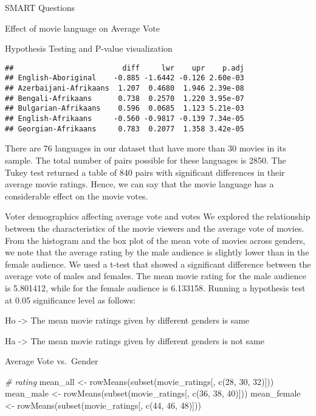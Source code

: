 \documentclass[
  ignorenonframetext,
]{beamer}
\newenvironment{Shaded}{\begin{snugshade}}{\end{snugshade}}
\newcommand{\CommentTok}[1]{\textcolor[rgb]{0.56,0.35,0.01}{\textit{#1}}}
\newcommand{\DecValTok}[1]{\textcolor[rgb]{0.00,0.00,0.81}{#1}}
\newcommand{\FunctionTok}[1]{\textcolor[rgb]{0.00,0.00,0.00}{#1}}
\newcommand{\NormalTok}[1]{#1}
\newcommand{\OtherTok}[1]{\textcolor[rgb]{0.56,0.35,0.01}{#1}}
\begin{document}
\begin{frame}[fragile]{SMART Questions}
\begin{block}{Effect of movie language on Average Vote}
\begin{block}{Hypothesis Testing and P-value visualization}
\begin{verbatim}
##                         diff     lwr    upr    p.adj
## English-Aboriginal    -0.885 -1.6442 -0.126 2.60e-03
## Azerbaijani-Afrikaans  1.207  0.4680  1.946 2.39e-08
## Bengali-Afrikaans      0.738  0.2570  1.220 3.95e-07
## Bulgarian-Afrikaans    0.596  0.0685  1.123 5.21e-03
## English-Afrikaans     -0.560 -0.9817 -0.139 7.34e-05
## Georgian-Afrikaans     0.783  0.2077  1.358 3.42e-05
\end{verbatim}

There are 76 languages in our dataset that have more than 30 movies in
its sample. The total number of pairs possible for these languages is
2850. The Tukey test returned a table of 840 pairs with significant
differences in their average movie ratings. Hence, we can say that the
movie language has a considerable effect on the movie votes.
\end{block}
\end{block}

\begin{block}{Voter demographics affecting average vote and votes}
\protect\hypertarget{voter-demographics-affecting-average-vote-and-votes}{}
We explored the relationship between the characteristics of the movie
viewers and the average vote of movies. From the histogram and the box
plot of the mean vote of movies across genders, we note that the average
rating by the male audience is slightly lower than in the female
audience. We used a t-test that showed a significant difference between
the average vote of males and females. The mean movie rating for the
male audience is 5.801412, while for the female audience is 6.133158.
Running a hypothesis test at 0.05 significance level as follows:

Ho -\textgreater{} The mean movie ratings given by different genders is
same

Ha -\textgreater{} The mean movie ratings given by different genders is
not same

\begin{block}{Average Vote vs.~Gender}
\protect\hypertarget{average-vote-vs.-gender}{}
\begin{Shaded}
\begin{Highlighting}[]
\CommentTok{\# rating}
\NormalTok{mean\_all }\OtherTok{\textless{}{-}} \FunctionTok{rowMeans}\NormalTok{(}\FunctionTok{subset}\NormalTok{(movie\_ratings[, }\FunctionTok{c}\NormalTok{(}\DecValTok{28}\NormalTok{, }\DecValTok{30}\NormalTok{, }\DecValTok{32}\NormalTok{)]))}
\NormalTok{mean\_male }\OtherTok{\textless{}{-}} \FunctionTok{rowMeans}\NormalTok{(}\FunctionTok{subset}\NormalTok{(movie\_ratings[, }\FunctionTok{c}\NormalTok{(}\DecValTok{36}\NormalTok{, }\DecValTok{38}\NormalTok{, }\DecValTok{40}\NormalTok{)]))}
\NormalTok{mean\_female }\OtherTok{\textless{}{-}} \FunctionTok{rowMeans}\NormalTok{(}\FunctionTok{subset}\NormalTok{(movie\_ratings[, }\FunctionTok{c}\NormalTok{(}\DecValTok{44}\NormalTok{, }\DecValTok{46}\NormalTok{, }\DecValTok{48}\NormalTok{)]))}


\end{Highlighting}
\end{Shaded}
\end{block}
\end{block}
\end{frame}
\end{document}
